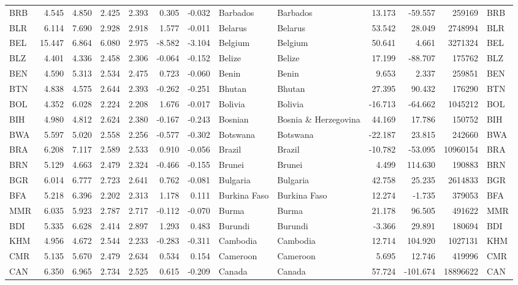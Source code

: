 \begin{tabular}{lrrrrrrllrrrl}
BRB & 4.545 & 4.850 & 2.425 & 2.393 & 0.305 & -0.032 & Barbados & Barbados & 13.173 & -59.557 & 259169 & BRB \\
BLR & 6.114 & 7.690 & 2.928 & 2.918 & 1.577 & -0.011 & Belarus & Belarus & 53.542 & 28.049 & 2748994 & BLR \\
BEL & 15.447 & 6.864 & 6.080 & 2.975 & -8.582 & -3.104 & Belgium & Belgium & 50.641 & 4.661 & 3271324 & BEL \\
BLZ & 4.401 & 4.336 & 2.458 & 2.306 & -0.064 & -0.152 & Belize & Belize & 17.199 & -88.707 & 175762 & BLZ \\
BEN & 4.590 & 5.313 & 2.534 & 2.475 & 0.723 & -0.060 & Benin & Benin & 9.653 & 2.337 & 259851 & BEN \\
BTN & 4.838 & 4.575 & 2.644 & 2.393 & -0.262 & -0.251 & Bhutan & Bhutan & 27.395 & 90.432 & 176290 & BTN \\
BOL & 4.352 & 6.028 & 2.224 & 2.208 & 1.676 & -0.017 & Bolivia & Bolivia & -16.713 & -64.662 & 1045212 & BOL \\
BIH & 4.980 & 4.812 & 2.624 & 2.380 & -0.167 & -0.243 & Bosnian & Bosnia \& Herzegovina & 44.169 & 17.786 & 150752 & BIH \\
BWA & 5.597 & 5.020 & 2.558 & 2.256 & -0.577 & -0.302 & Botswana & Botswana & -22.187 & 23.815 & 242660 & BWA \\
BRA & 6.208 & 7.117 & 2.589 & 2.533 & 0.910 & -0.056 & Brazil & Brazil & -10.782 & -53.095 & 10960154 & BRA \\
BRN & 5.129 & 4.663 & 2.479 & 2.324 & -0.466 & -0.155 & Brunei & Brunei & 4.499 & 114.630 & 190883 & BRN \\
BGR & 6.014 & 6.777 & 2.723 & 2.641 & 0.762 & -0.081 & Bulgaria & Bulgaria & 42.758 & 25.235 & 2614833 & BGR \\
BFA & 5.218 & 6.396 & 2.202 & 2.313 & 1.178 & 0.111 & Burkina Faso & Burkina Faso & 12.274 & -1.735 & 379053 & BFA \\
MMR & 6.035 & 5.923 & 2.787 & 2.717 & -0.112 & -0.070 & Burma & Burma & 21.178 & 96.505 & 491622 & MMR \\
BDI & 5.335 & 6.628 & 2.414 & 2.897 & 1.293 & 0.483 & Burundi & Burundi & -3.366 & 29.891 & 180694 & BDI \\
KHM & 4.956 & 4.672 & 2.544 & 2.233 & -0.283 & -0.311 & Cambodia & Cambodia & 12.714 & 104.920 & 1027131 & KHM \\
CMR & 5.135 & 5.670 & 2.479 & 2.634 & 0.534 & 0.154 & Cameroon & Cameroon & 5.695 & 12.746 & 419996 & CMR \\
CAN & 6.350 & 6.965 & 2.734 & 2.525 & 0.615 & -0.209 & Canada & Canada & 57.724 & -101.674 & 18896622 & CAN \\

\end{tabular}
